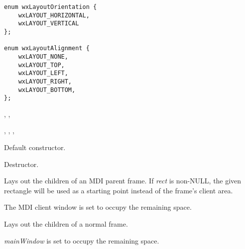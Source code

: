
{\small
\begin{verbatim}
enum wxLayoutOrientation {
    wxLAYOUT_HORIZONTAL,
    wxLAYOUT_VERTICAL
};

enum wxLayoutAlignment {
    wxLAYOUT_NONE,
    wxLAYOUT_TOP,
    wxLAYOUT_LEFT,
    wxLAYOUT_RIGHT,
    wxLAYOUT_BOTTOM,
};
\end{verbatim}
}


, , 

,\rtfsp
{},\rtfsp
{},\rtfsp
{}




Default constructor.



Destructor.

\label{wxlayoutalgorithmlayoutmdiframe}


Lays out the children of an MDI parent frame. If {\it rect} is non-NULL, the
given rectangle will be used as a starting point instead of the frame's client area.

The MDI client window is set to occupy the remaining space.

\label{wxlayoutalgorithmlayoutframe}


Lays out the children of a normal frame.

{\it mainWindow} is set to occupy the remaining space.

